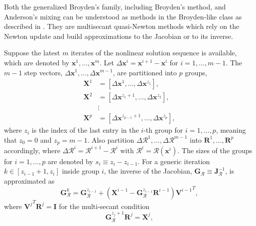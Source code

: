           Both the generalized Broyden's family, including Broyden's method, and Anderson's mixing can be understood as methods in the Broyden-like class as described in \cite{fang_two_2009}.
          They are multisecant quasi-Newton methods which rely on the Newton update and build approximations to the Jacobian or to its inverse.

          Suppose the latest \(m\) iterates of the nonlinear solution sequence is available, which are denoted by \(\mathbf{x}^{1}, \ldots, \mathbf{x}^{m}\).
          Let \(\Delta \mathbf{x}^{i}=\mathbf{x}^{i+1}- \mathbf{x}^{i}\) for \(i=1, \ldots, m-1\).
          The $m-1$ step vectors, \(\Delta \mathbf{x}^{1}, \ldots, \Delta \mathbf{x}^{m-1}\), are partitioned into \(p\) groups,
          \begin{align}
            \mathbf{X}^{1} & =\left[\Delta \mathbf{x}^{1}, \ldots, \Delta \mathbf{x}^{z_{1}}\right], \\
            \mathbf{X}^{2} & =\left[\Delta \mathbf{x}^{z_{1}+1}, \ldots, \Delta \mathbf{x}^{z_{2}}\right],\\
                           & \vdots \\
            \mathbf{X}^{p} & =\left[\Delta \mathbf{x}^{z_{p-1}+1}, \ldots, \Delta \mathbf{x}^{z_{p}}\right],
          \end{align}
          where \(z_{i}\) is the index of the last entry in the \(i\)-th group for \(i=1, \ldots, p\), meaning that \(z_{0}=0\) and \(z_{p}=m-1\).
          Also partition \(\Delta \bm{\mathcal{R}}^{1}, \ldots, \Delta \bm{\mathcal{R}}^{m-1}\) into \(\mathbf R^{1}, \ldots, \mathbf R^p\) accordingly, where \(\Delta \bm{\mathcal{R}}^{i}=\bm{\mathcal{R}}^{i+1}- \bm{\mathcal{R}}^{i}\) with \(\bm{\mathcal{R}}^{i}=\bm{\mathcal{R}}(\mathbf{x}^{i})\).
          The sizes of the groups for \(i=1, \ldots, p\) are denoted by \(s_{i}\equiv z_{i}-z_{i-1}\).
          For a generic iteration $k\in[z_{i-1}+1, z_{i}]$ inside group $i$, the inverse of the Jacobian, \(\mathbf{G}_{\bm{\mathcal{R}}}\equiv \bm{\mathbf{J}}_{\bm{\mathcal{R}}}^{-1}\), is approximated as
          \begin{equation} \label{sec:broyden_like_class_g_update}
            \mathbf{G}_{\bm{\mathcal{R}}}^{k} = \mathbf{G}_{\bm{\mathcal{R}}}^{z_{i-1}}+\left(\mathbf{X}^{i-1}-\mathbf{G}_{\bm{\mathcal{R}}}^{z_{i-1}} \mathbf R^{i-1}\right) {\mathbf{V}^{i-1}}^T,
          \end{equation}
          where \({\mathbf{V}^{j}}^T \mathbf{R}^{j}=\mathbf{I}\) for the multi-secant condition
          \begin{equation}
            \mathbf{G}_{\bm{\mathcal{R}}}^{z_j+1} \mathbf R^j = \mathbf X^j,
          \end{equation}
